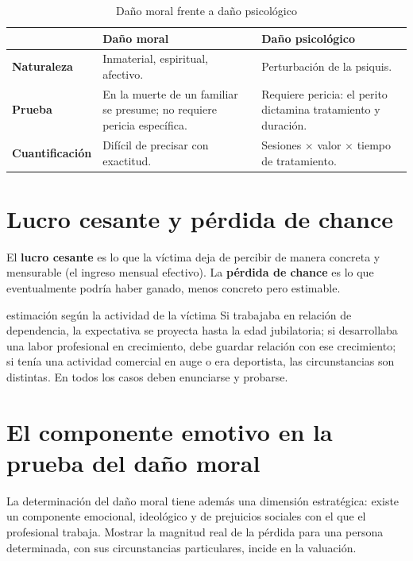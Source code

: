 \documentclass[12pt,oneside]{book}
\begin{document}
\begin{table}[H]
\centering
\caption{Daño moral frente a daño psicológico}
\begin{tabularx}{\textwidth}{>{\raggedright\arraybackslash\bfseries}p{} X X}
\toprule
 & Daño moral & Daño psicológico \\
\midrule
Naturaleza & Inmaterial, espiritual, afectivo. & Perturbación de la psiquis. \\
Prueba & En la muerte de un familiar se presume; no requiere pericia específica. & Requiere pericia: el perito dictamina tratamiento y duración. \\
Cuantificación & Difícil de precisar con exactitud. & Sesiones $\times$ valor $\times$ tiempo de tratamiento. \\
\bottomrule
\end{tabularx}
\end{table}

\section{Lucro cesante y pérdida de chance}

El \textbf{lucro cesante} es lo que la víctima deja de percibir de manera concreta y mensurable (el ingreso mensual efectivo). La \textbf{pérdida de chance} es lo que eventualmente podría haber ganado, menos concreto pero estimable.

\begin{ejemplo}{estimación según la actividad de la víctima}
Si trabajaba en relación de dependencia, la expectativa se proyecta hasta la edad jubilatoria; si desarrollaba una labor profesional en crecimiento, debe guardar relación con ese crecimiento; si tenía una actividad comercial en auge o era deportista, las circunstancias son distintas. En todos los casos deben enunciarse y probarse.
\end{ejemplo}

\section{El componente emotivo en la prueba del daño moral}\label{sec:moral-estrategia}

La determinación del daño moral tiene además una dimensión estratégica: existe un componente emocional, ideológico y de prejuicios sociales con el que el profesional trabaja. Mostrar la magnitud real de la pérdida para una persona determinada, con sus circunstancias particulares, incide en la valuación.
\end{document}
